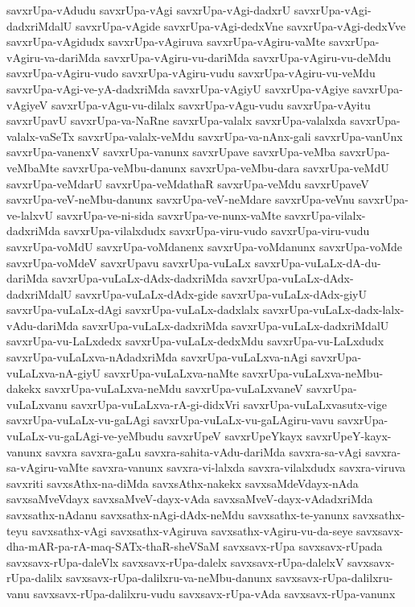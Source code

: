 {savxrUpa-vAdudu
savxrUpa-vAgi
savxrUpa-vAgi-dadxrU
savxrUpa-vAgi-dadxriMdalU
savxrUpa-vAgide
savxrUpa-vAgi-dedxVne
savxrUpa-vAgi-dedxVve
savxrUpa-vAgidudx
savxrUpa-vAgiruva
savxrUpa-vAgiru-vaMte
savxrUpa-vAgiru-va-dariMda
savxrUpa-vAgiru-vu-dariMda
savxrUpa-vAgiru-vu-deMdu
savxrUpa-vAgiru-vudo
savxrUpa-vAgiru-vudu
savxrUpa-vAgiru-vu-veMdu
savxrUpa-vAgi-ve-yA-dadxriMda
savxrUpa-vAgiyU
savxrUpa-vAgiye
savxrUpa-vAgiyeV
savxrUpa-vAgu-vu-dilalx
savxrUpa-vAgu-vudu
savxrUpa-vAyitu
savxrUpavU
savxrUpa-va-NaRne
savxrUpa-valalx
savxrUpa-valalxda
savxrUpa-valalx-vaSeTx
savxrUpa-valalx-veMdu
savxrUpa-va-nAnx-gali
savxrUpa-vanUnx
savxrUpa-vanenxV
savxrUpa-vanunx
savxrUpave
savxrUpa-veMba
savxrUpa-veMbaMte
savxrUpa-veMbu-danunx
savxrUpa-veMbu-dara
savxrUpa-veMdU
savxrUpa-veMdarU
savxrUpa-veMdathaR
savxrUpa-veMdu
savxrUpaveV
savxrUpa-veV-neMbu-danunx
savxrUpa-veV-neMdare
savxrUpa-veVnu
savxrUpa-ve-lalxvU
savxrUpa-ve-ni-sida
savxrUpa-ve-nunx-vaMte
savxrUpa-vilalx-dadxriMda
savxrUpa-vilalxdudx
savxrUpa-viru-vudo
savxrUpa-viru-vudu
savxrUpa-voMdU
savxrUpa-voMdanenx
savxrUpa-voMdanunx
savxrUpa-voMde
savxrUpa-voMdeV
savxrUpavu
savxrUpa-vuLaLx
savxrUpa-vuLaLx-dA-du-dariMda
savxrUpa-vuLaLx-dAdx-dadxriMda
savxrUpa-vuLaLx-dAdx-dadxriMdalU
savxrUpa-vuLaLx-dAdx-gide
savxrUpa-vuLaLx-dAdx-giyU
savxrUpa-vuLaLx-dAgi
savxrUpa-vuLaLx-dadxlalx
savxrUpa-vuLaLx-dadx-lalx-vAdu-dariMda
savxrUpa-vuLaLx-dadxriMda
savxrUpa-vuLaLx-dadxriMdalU
savxrUpa-vu-LaLxdedx
savxrUpa-vuLaLx-dedxMdu
savxrUpa-vu-LaLxdudx
savxrUpa-vuLaLxva-nAdadxriMda
savxrUpa-vuLaLxva-nAgi
savxrUpa-vuLaLxva-nA-giyU
savxrUpa-vuLaLxva-naMte
savxrUpa-vuLaLxva-neMbu-dakekx
savxrUpa-vuLaLxva-neMdu
savxrUpa-vuLaLxvaneV
savxrUpa-vuLaLxvanu
savxrUpa-vuLaLxva-rA-gi-didxVri
savxrUpa-vuLaLxvasutx-vige
savxrUpa-vuLaLx-vu-gaLAgi
savxrUpa-vuLaLx-vu-gaLAgiru-vavu
savxrUpa-vuLaLx-vu-gaLAgi-ve-yeMbudu
savxrUpeV
savxrUpeYkayx
savxrUpeY-kayx-vanunx
savxra
savxra-gaLu
savxra-sahita-vAdu-dariMda
savxra-sa-vAgi
savxra-sa-vAgiru-vaMte
savxra-vanunx
savxra-vi-lalxda
savxra-vilalxdudx
savxra-viruva
savxriti
savxsAthx-na-diMda
savxsAthx-nakekx
savxsaMdeVdayx-nAda
savxsaMveVdayx
savxsaMveV-dayx-vAda
savxsaMveV-dayx-vAdadxriMda
savxsathx-nAdanu
savxsathx-nAgi-dAdx-neMdu
savxsathx-te-yanunx
savxsathx-teyu
savxsathx-vAgi
savxsathx-vAgiruva
savxsathx-vAgiru-vu-da-seye
savxsavx-dha-mAR-pa-rA-maq-SATx-thaR-sheVSaM
savxsavx-rUpa
savxsavx-rUpada
savxsavx-rUpa-daleVlx
savxsavx-rUpa-dalelx
savxsavx-rUpa-dalelxV
savxsavx-rUpa-dalilx
savxsavx-rUpa-dalilxru-va-neMbu-danunx
savxsavx-rUpa-dalilxru-vanu
savxsavx-rUpa-dalilxru-vudu
savxsavx-rUpa-vAda
savxsavx-rUpa-vanunx
}
